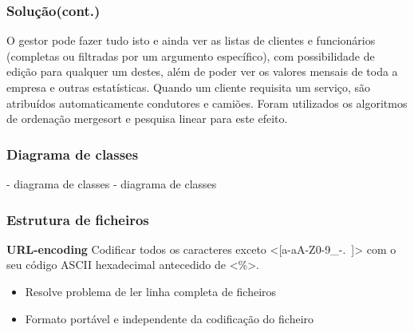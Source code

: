 \documentclass{beamer}
\def\\{}
\def\texttt#1{<#1>}
\begin{document}
\begin{frame}
\frametitle{Solução(cont.)}

O gestor pode fazer tudo isto e ainda ver as listas de clientes e funcionários (completas ou filtradas por um argumento específico), com possibilidade de edição para qualquer um destes, além de poder ver os valores mensais de toda a empresa e outras estatísticas.\\
Quando um cliente requisita um serviço, são atribuídos automaticamente condutores e camiões.
Foram utilizados os algoritmos de ordenação mergesort e pesquisa linear para este efeito.
\end{frame}

\begin{frame}
\frametitle{Diagrama de classes}


- diagrama de classes
- diagrama de classes
\end{frame}

\begin{frame}
\frametitle{Estrutura de ficheiros}
\begin{center}
\begin{minipage}{0.35\textwidth}
	\small
\end{minipage}
\begin{minipage}{0.6\textwidth}
\textbf{URL-encoding}\\
Codificar todos os caracteres exceto \texttt{[a-aA-Z0-9\_-.~]} com o seu código ASCII hexadecimal antecedido de \texttt{\%}.
\begin{itemize}
	\item Resolve problema de ler linha completa de ficheiros
	\item Formato portável e independente da codificação do ficheiro
\end{itemize}
\end{minipage}
\end{center}
\end{frame}
\end{document}
